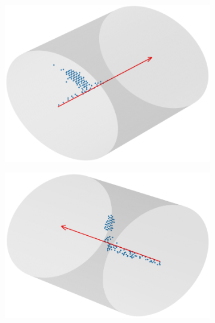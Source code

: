 \documentclass[a4paper,12pt,oneside]{book}
\begin{document}
\begin{figure}[H]
\centering
    \begin{subfigure}[b]{0.48\textwidth}
        \centering
        \includegraphics[scale=0.38]{figs/ex_ev_1.png}
        \caption{}
        \label{subfig:ex_ev_1}
    \end{subfigure}%
    \hfill
    \begin{subfigure}[b]{0.48\textwidth}
        \centering
        \includegraphics[scale=0.38]{figs/ex_ev_2.png}
        \caption{}
        \label{subfig:ex_ev_2}
    \end{subfigure}
    \begin{subfigure}[b]{0.48\textwidth}
        \centering

\end{subfigure}
\end{figure}
\end{document}
